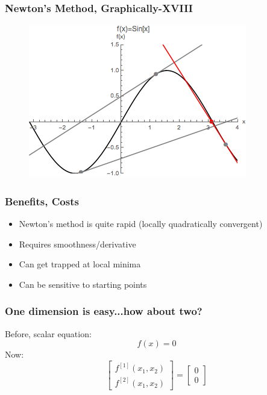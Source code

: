 \documentclass{beamer}
\begin{document}
\begin{frame}
\frametitle[alignment=center]{Newton's Method, Graphically-XVIII}
\begin{figure}[htdb!]
\centering
\includegraphics[scale=0.8]{Newton_18.png}
\end{figure}
\end{frame}

\begin{frame}
\frametitle[alignment=center]{Benefits, Costs}
\begin{itemize}
\item Newton's method is quite rapid (locally quadratically convergent)
\bigskip
\item Requires smoothness/derivative
\bigskip
\item Can get trapped at local minima
\bigskip
\item Can be sensitive to starting points
\end{itemize}
\end{frame}

\begin{frame}
\frametitle[alignment=center]{One dimension is easy...how about two?}
Before, scalar equation:
$$f(x)=0$$
Now:
$$\left[\begin{array}{c}f^{[1]}(x_1,x_2) \\ f^{[2]}(x_1,x_2)\end{array}\right]=\left[\begin{array}{c}0 \\ 0\end{array}\right]$$
\end{frame}
\end{document}
